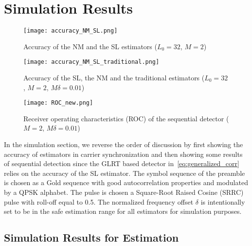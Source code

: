 \section{Simulation Results}%
\label{sec:simulations}

\begin{figure}[t]
    \centerline{\texttt{[image: accuracy\_NM\_SL.png]}}
    \caption{Accuracy of the NM and the SL estimators ($L_0=32$, $M=2$)}
    \label{fig:accuracy_NM_SL}
    \end{figure}

\begin{figure}[t]
    \centerline{\texttt{[image: accuracy\_NM\_SL\_traditional.png]}}
    \caption{Accuracy of the SL, the NM and the traditional estimators ($L_0=32$, $M=2$, $M\delta=0.01$)}
    \label{fig:accuracy_NM_SL_traditional}
    \end{figure}

\begin{figure}[t]
    \centerline{\texttt{[image: ROC\_new.png]}}
    \caption{Receiver operating characteristics (ROC) of the sequential detector ($M=2$, $M\delta=0.01$)}
    \label{fig:Receiver operating characteristics}
    \end{figure}

In the simulation section, we reverse the order of discussion by first showing 
the accuracy of estimators in carrier synchronization and then showing some results of sequential detection since
the GLRT based detector in~\eqref{eq:generalized_corr} relies on the accuracy of 
the SL estimator.
The symbol sequence of the preamble is chosen as a Gold sequence 
with good autocorrelation properties and
modulated by a QPSK alphabet.
The pulse is chosen a
Square-Root Raised Cosine (SRRC) pulse with roll-off equal to 0.5.
The normalized frequency offset $\delta$ is intentionally set to be in
the safe estimation range for all estimators for simulation purposes. 

\subsection{Simulation Results for Estimation}%


